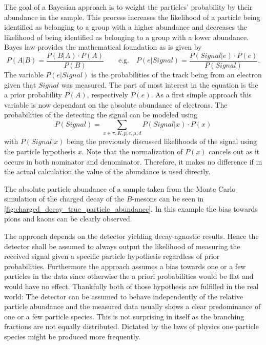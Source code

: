 The goal of a Bayesian approach is to weight the particles' probability by their abundance in the sample. This process increases the likelihood of a particle being identified as belonging to a group with a higher abundance and decreases the likelihood of being identified as belonging to a group with a lower abundance. Bayes law provides the mathematical foundation as is given by
\begin{equation*}
	\displaystyle P(A|B) = \frac{P(B|A) \cdot P(A)}{P(B)}
	\qquad
	\text{e.g.} \quad P(e|Signal) = \frac{P(Signal|e) \cdot P(e)}{P(Signal)}.
\end{equation*}
The variable $P(e|Signal)$ is the probabilities of the track being from an electron given that $Signal$ was measured. The part of most interest in the equation is the a prior probability $P(A)$, respectively $P(e)$. As a first simple approach this variable is now dependant on the absolute abundance of electrons. The probabilities of the detecting the signal can be modeled using
\begin{equation*}
	P(Signal) = \sum \limits_{x \in {\pi, K, p, e, \mu, d}} P(Signal|x) \cdot P(x)
\end{equation*}
with $P(Signal|x)$ being the previously discussed likelihoods of the signal using the particle hypothesis $x$. Note that the normalization of $P(x)$ cancels out as it occurs in both nominator and denominator. Therefore, it makes no difference if in the actual calculation the value of the abundance is used directly.

The absolute particle abundance of a sample taken from the Monte Carlo simulation of the charged decay of the $B$-mesons can be seen in \autoref{fig:charged_decay_true_particle_abundance}. In this example the bias towards pions and kaons can be clearly observed.

The approach depends on the detector yielding decay-agnostic results. Hence the detector shall be assumed to always output the likelihood of measuring the received signal given a specific particle hypothesis regardless of prior probabilities. Furthermore the approach assumes a bias towards one or a few particles in the data since otherwise the a priori probabilities would be flat and would have no effect.
Thankfully both of those hypothesis are fulfilled in the real world: The detector can be assumed to behave independently of the relative particle abundance and the measured data usually shows a clear predominance of one or a few particle species. This is not surprising in itself as the branching fractions are not equally distributed. Dictated by the laws of physics one particle species might be produced more frequently.

